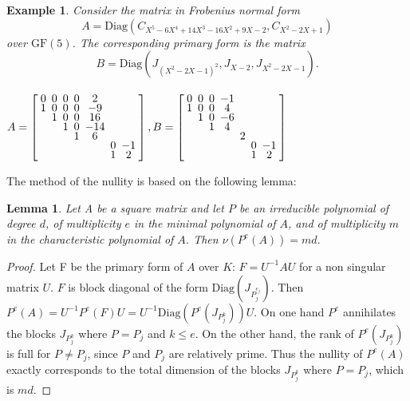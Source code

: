 \documentclass{article}
\newtheorem{lem}[thm]{Lemma}
\newtheorem{exmp}[thm]{Example}
\begin{document}
\begin{exmp}
Consider the matrix in Frobenius normal form 
{\small $$A= \text{Diag}(C_{X^5-6X^4 +14X^3 - 16X^2 + 9X-2},C_{X^2-2X+1})$$} over
$\text{GF}(5)$. The corresponding 
 primary form is the matrix {\small $$B = \text{Diag}(J_{(X^2-2X-1)^2}, J_{X-2},
   J_{X^2-2X-1}).$$}\\
{\scriptsize
$
\renewcommand{\arraystretch}{.6}
\setlength{\arraycolsep}{.5\arraycolsep}
A= 
\left[
\begin{array}{ccccccc}
0& 0 & 0 & 0 & 2 &  &\\
1& 0 & 0 & 0 & -9 &  &\\
 & 1 & 0 & 0 & 16 &  &\\
 &   & 1 & 0 & -14 &  &\\
 &   &   & 1 & 6 &  & \\
 &   &   &   &   & 0& -1\\
 &   &   &   &   & 1& 2\\
\end{array}
\right]
,
B= 
\left[
\begin{array}{ccccccc}
0& 0  & 0 & -1  &  &  &\\
1& 0 & 0 & 4 &  &  &\\
 & 1 & 0 & -6 &  &  &\\
 &   & 1 & 4 &  &  &\\
 &   &   &   & 2&  & \\
 &   &   &   &  & 0& -1\\
 &   &   &   &  & 1 &2\\
\end{array}
\right]
$}
\end{exmp}
The method of the nullity is based on the following lemma:
\begin{lem}
Let A be a square matrix and 
let $P$ be an irreducible polynomial 
of degree $d$, of multiplicity $e$ in the minimal polynomial of $A$,
and of multiplicity $m$ in the characteristic polynomial of $A$.  
Then $\nu(P^{e}(A))=md.$
\end{lem}
\begin{proof}
Let F be the primary form of $A$ over $K$: $F=U^{-1}AU$ for a non singular
matrix $U$.
$F$ is block diagonal of the form 
$\text{Diag}(J_{P_j^{e_{j}}})$.
Then $P^{e}(A) = U^{-1}P^{e}(F)U =
U^{-1}\text{Diag}(P^{e}(J_{P_j^k}))U$.
On one hand $P^{e}$ annihilates the blocks $J_{P_j^k}$ where $P = P_j$ and
$k\leq e$.
On the other hand, the rank of $P^{e}(J_{P_j^k})$ is full for $P \neq P_j$,
since $P$ and $P_j$ are relatively prime.
Thus the nullity of $P^{e}(A)$ exactly corresponds to the
total dimension of the blocks $J_{P_j^k}$ where $P = P_j$, which is $md$.
\end{proof}
\end{document}
